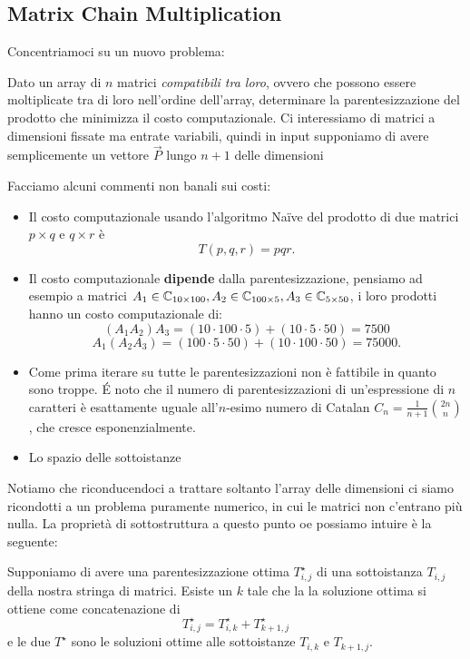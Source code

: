 \documentclass[11pt]{scrartcl}
\begin{document}
	\subsection{Matrix Chain Multiplication}
	
	Concentriamoci su un nuovo problema:
	\begin{problem}
		Dato un array di $n$ matrici \textit{compatibili tra loro}, ovvero  che possono essere moltiplicate tra di loro nell'ordine dell'array, determinare la parentesizzazione del prodotto che minimizza il costo computazionale. Ci interessiamo di matrici a dimensioni fissate ma entrate variabili, quindi in input supponiamo di avere semplicemente un vettore $\vec{P}$ lungo $n+1$ delle dimensioni  
	\end{problem}
	Facciamo alcuni commenti non banali sui costi:
	\begin{itemize}
		\item Il costo computazionale usando l'algoritmo Na\"ive del prodotto di due matrici $p\times q $ e $q\times r$ è 
		$$T(p,q,r)=pqr.$$
		\item Il costo computazionale \textbf{dipende} dalla parentesizzazione, pensiamo ad esempio a matrici $A_1\in \mathbb C_{10\times 100}, A_2\in \mathbb C_{100\times 5}, A_3\in \mathbb C_{5\times 50}$, i loro prodotti hanno un costo computazionale di:
		$$\left(A_1A_2\right)A_3=\left(10\cdot 100\cdot 5\right)+\left(10\cdot 5 \cdot 50\right)=7500$$
		$$A_1\left(A_2A_3\right)=\left(100\cdot 5 \cdot 50\right)+\left(10\cdot 100\cdot 50\right)=75000.$$
		\item Come prima iterare su tutte le parentesizzazioni non è fattibile in quanto sono troppe. \'E noto che il numero di parentesizzazioni di un'espressione di $n$ caratteri è esattamente uguale all'$n$-esimo numero di Catalan $C_n=\frac{1}{n+1}\binom{2n}{n}$, che cresce esponenzialmente.
		\item Lo spazio delle sottoistanze 
	\end{itemize}
	Notiamo che riconducendoci a trattare soltanto l'array delle dimensioni ci siamo ricondotti a un problema puramente numerico, in cui le matrici non c'entrano più nulla. La proprietà di sottostruttura a questo punto oe possiamo intuire è la seguente:
	\begin{theorem}
		Supponiamo di avere una parentesizzazione ottima $T^\star_{i,j}$ di una sottoistanza $T_{i,j}$ della nostra stringa di matrici. Esiste un $k$ tale che la la soluzione ottima si ottiene come concatenazione di 
		$$T^\star_{i,j}=T^\star_{i,k}+T^\star_{k+1,j}$$
		e le due $T^\star$ sono le soluzioni ottime alle sottoistanze $T_{i,k}$ e $T_{k+1,j}$. 
	\end{theorem}
\end{document}
